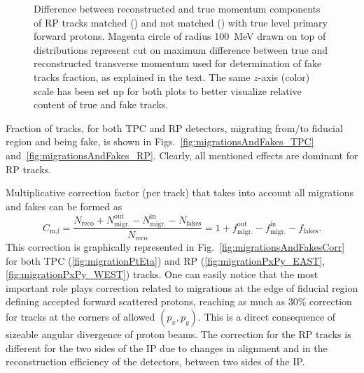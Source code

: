 \begin{figure}
{}%
\caption[Difference between reconstructed and true momentum components of RP tracks.]{Difference between reconstructed and true momentum components of RP tracks matched () and not matched () with true level primary forward protons. Magenta circle of radius 100~MeV drawn on top of distributions represent cut on maximum difference between true and reconstructed transverse momentum used for determination of fake tracks fraction, as explained in the text. The same $z$-axis (color) scale has been set up for both plots to better visualize relative content of true and fake tracks.} \label{fig:DeltaPyVsDeltaPx}
\end{figure}


Fraction of tracks, for both TPC and RP detectors, migrating from/to fiducial region and being fake, is shown in Figs.~\ref{fig:migrationsAndFakes_TPC} and~\ref{fig:migrationsAndFakes_RP}. Clearly, all mentioned effects are dominant for RP tracks.



Multiplicative correction factor (per track) that takes into account all migrations and fakes can be formed as
\begin{equation}
 C_{\text{m,f}} = \frac{N_{\textrm{reco}} + N_{\textrm{migr.}}^{\textrm{out}} - N_{\textrm{migr.}}^{\textrm{in}} - N_{\textrm{fakes}}}{N_{\textrm{reco}}} = 1 + f_{\text{migr.}}^{\text{out}} - f_{\text{migr.}}^{\text{in}} - f_{\text{fakes}}.
\end{equation}
This correction is graphically represented in Fig.~\ref{fig:migrationsAndFakesCorr} for both TPC (\ref{fig:migrationPtEta}) and RP (\ref{fig:migrationPxPy_EAST}, \ref{fig:migrationPxPy_WEST}) tracks. One can easily notice that the most important role plays correction related to migrations at the edge of fiducial region defining accepted forward scattered protons, reaching as much as 30\% correction for tracks at the corners of allowed $(p_{x}, p_{y})$. This is a direct consequence of sizeable angular divergence of proton beams. The correction for the RP tracks is different for the two sides of the IP due to changes in alignment and in the reconstruction efficiency of the detectors, between two sides of the IP.



